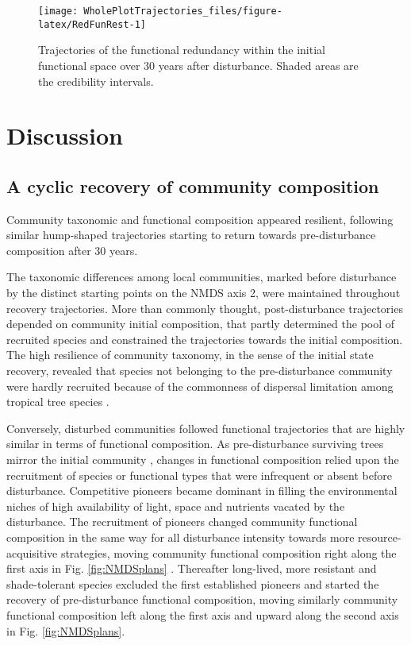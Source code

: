\documentclass[fleqn,10pt]{ArtEcoFoG} %
\begin{document}
\begin{figure}

{\centering \texttt{[image: WholePlotTrajectories\_files/figure-latex/RedFunRest-1]} 

}

\caption{Trajectories of the functional redundancy within the initial functional space over 30 years after disturbance. Shaded areas are the credibility intervals.}\label{fig:RedFunRest}
\end{figure}

\section{Discussion}\label{discussion}

\subsection{A cyclic recovery of community
composition}\label{a-cyclic-recovery-of-community-composition}

Community taxonomic and functional composition appeared resilient,
following similar hump-shaped trajectories starting to return towards
pre-disturbance composition after 30 years.

The taxonomic differences among local communities, marked before
disturbance by the distinct starting points on the NMDS axis 2, were
maintained throughout recovery trajectories. More than commonly thought,
post-disturbance trajectories depended on community initial composition,
that partly determined the pool of recruited species and constrained the
trajectories towards the initial composition. The high resilience of
community taxonomy, in the sense of the initial state recovery, revealed
that species not belonging to the pre-disturbance community were hardly
recruited because of the commonness of dispersal limitation among
tropical tree species \citep{Svenning2005}.

Conversely, disturbed communities followed functional trajectories that
are highly similar in terms of functional composition. As
pre-disturbance surviving trees mirror the initial community
\citep{Herault2018}, changes in functional composition relied upon the
recruitment of species or functional types that were infrequent or
absent before disturbance. Competitive pioneers became dominant in
filling the environmental niches of high availability of light, space
and nutrients vacated by the disturbance. The recruitment of pioneers
changed community functional composition in the same way for all
disturbance intensity towards more resource-acquisitive strategies,
moving community functional composition right along the first axis in
Fig. \ref{fig:NMDSplans} \citep{Westoby1998, Wright2004, Reich2014}.
Thereafter long-lived, more resistant and shade-tolerant species
excluded the first established pioneers and started the recovery of
pre-disturbance functional composition, moving similarly community
functional composition left along the first axis and upward along the
second axis in Fig. \ref{fig:NMDSplans}.
\end{document}
